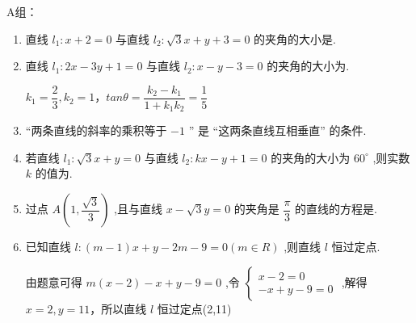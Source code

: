 A组：
\begin{enumerate}
    \item 直线 ${l}_{1} : x + 2 = 0$ 与直线 ${l}_{2} : \sqrt{3}x + y + 3 = 0$ 的夹角的大小是.
    
    \item 直线 ${l}_{1} : {2x} - {3y} + 1 = 0$ 与直线 ${l}_{2} : x - y - 3 = 0$ 的夹角的大小为.
    \begin{jieda}
        $k_1 = \dfrac{2}{3}, k_2 = 1$，$tan\theta = \dfrac{k_2-k_1}{1+k_1k_2} = \dfrac{1}{5}$
    \end{jieda}

    \item “两条直线的斜率的乘积等于 $-1$ ” 是 “这两条直线互相垂直” 的条件.
    
    \item 若直线 ${l}_{1} : \sqrt{3}x + y = 0$ 与直线 ${l}_{2} : {kx} - y + 1 = 0$ 的夹角的大小为 ${60}^{ \circ  }$ ,则实数 $k$ 的值为.

    \item 过点 $A\left( {1,\dfrac{\sqrt{3}}{3}}\right)$ ,且与直线 $x - \sqrt{3}y = 0$ 的夹角是 $\dfrac{\pi }{3}$ 的直线的方程是.

    \item 已知直线 $l : \left( {m - 1}\right) x + y - {2m} - 9 = 0\left( {m \in  {R}}\right)$ ,则直线 $l$ 恒过定点.
    \begin{jieda}
        由题意可得 $m\left( {x - 2}\right)  - x + y - 9 = 0$ ,令 $\left\{  \begin{array}{l} x - 2 = 0 \\   - x + y - 9 = 0 \end{array}\right.$ ,解得 $x = 2,y = {11}$，所以直线 $l$ 恒过定点(2,11)
    \end{jieda}
\end{enumerate}

